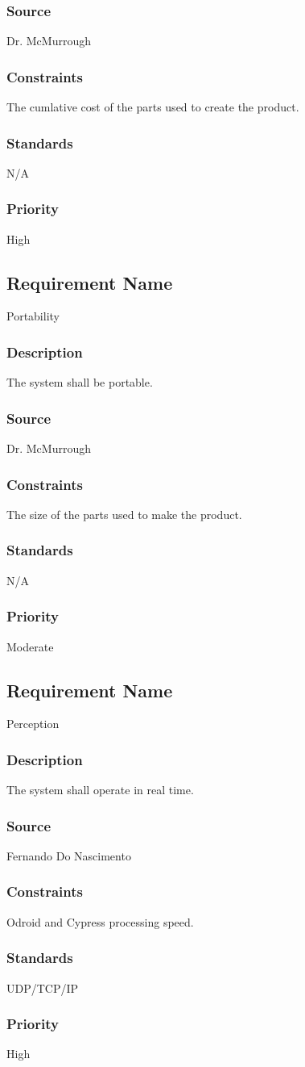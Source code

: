 \subsubsection{Source}
Dr. McMurrough
\subsubsection{Constraints}
The cumlative cost of the parts used to create the product.
\subsubsection{Standards}
N/A
\subsubsection{Priority}
High

\subsection{Requirement Name}
Portability
\subsubsection{Description}
The system shall be portable.
\subsubsection{Source}
Dr. McMurrough
\subsubsection{Constraints}
The size of the parts used to make the product.
\subsubsection{Standards}
N/A
\subsubsection{Priority}
Moderate

\subsection{Requirement Name}
Perception
\subsubsection{Description}
The system shall operate in real time.
\subsubsection{Source}
Fernando Do Nascimento
\subsubsection{Constraints}
Odroid and Cypress processing speed.
\subsubsection{Standards}
UDP/TCP/IP
\subsubsection{Priority}
High